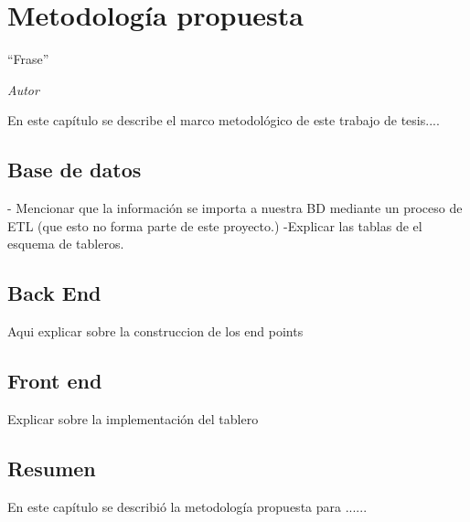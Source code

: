  \chapter{Metodología propuesta}\label{cap:propuesta}

\epigraph{``Frase''
}{\textit{ Autor }}

En este capítulo se describe el marco metodológico de este trabajo de tesis....

\section{Base de datos}\label{sec:bd}
- Mencionar que la información se importa a nuestra BD mediante un proceso de ETL (que esto no forma parte de este proyecto.)
-Explicar las tablas de el esquema de tableros.

\section{Back End}\label{sec:backend}
Aqui explicar sobre la construccion de los end points

\section{Front end}\label{sec:frontent}
Explicar sobre la implementación del tablero


\section{Resumen}
En este capítulo se describió la metodología propuesta para ......
 

